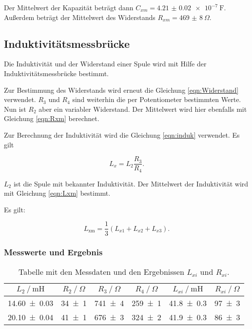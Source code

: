 Der Mittelwert der Kapazität beträgt dann $C_{xm} = \SI{4.21(2)e-7}{\farad}$.
Außerdem beträgt der Mittelwert des Widerstands $R_{xm} =
\SI{469(8)}{\Omega}$.

\subsection{Induktivitätsmessbrücke}
\label{subsec:auswimb}

Die Induktivität und der Widerstand einer Spule wird mit Hilfe der Induktivitätsmessbrücke
bestimmt.

Zur Bestimmung des Widerstands wird erneut die Gleichung \eqref{eqn:Widerstand}
verwendet. $R_3$ und $R_4$ sind weiterhin die per Potentiometer bestimmten Werte.
Nun ist $R_2$ aber ein variabler Widerstand. Der Mittelwert wird hier ebenfalls
mit Gleichung \eqref{eqn:Rxm} berechnet.

Zur Berechnung der Induktivität wird die Gleichung \eqref{eqn:induk} verwendet.
Es gilt

\begin{equation}
  L_x = L_2\frac{R_3}{R_4}.
  \label{eqn:induk}
\end{equation}

$L_2$ ist die Spule mit bekannter Induktivität. Der Mittelwert der Induktivität wird
mit Gleichung \eqref{eqn:Lxm} bestimmt.

Es gilt:

\begin{equation}
  L_{\text{xm}} = \frac{1}{3}(L_{x1} + L_{x2} + L_{x3}).
  \label{eqn:Lxm}
\end{equation}

\subsubsection{Messwerte und Ergebnis}

\begin{table}
  \centering
  \caption{Tabelle mit den Messdaten und den Ergebnissen $L_{xi}$ und $R_{xi}$.}
  \label{tab:Induk17}
  \begin{tabular}{c c c c c c}
    \toprule
    $L_2 \ /\ \si{\milli\henry}$ & $R_2 \ /\ \si{\Omega}$ & $R_3 \ /\ \si{\Omega}$ &
    $R_4 \ /\ \si{\Omega}$ & $L_{xi} \ /\ \si{\milli\henry}$ & $R_{xi} \ /\ \si{\Omega}$ \\
    \midrule
    \num{14.60 +- 0.03} & \num{34 +- 1} & \num{741 +- 4} & \num{259 +- 1} & \num{41.8 +- 0.3} & \num{97 +- 3}\\
    \num{20.10 +- 0.04} & \num{41 +- 1} & \num{676 +- 3} & \num{324 +- 2} & \num{41.9 +- 0.3} & \num{86 +- 3}\\
    \bottomrule
  \end{tabular}
\end{table}

